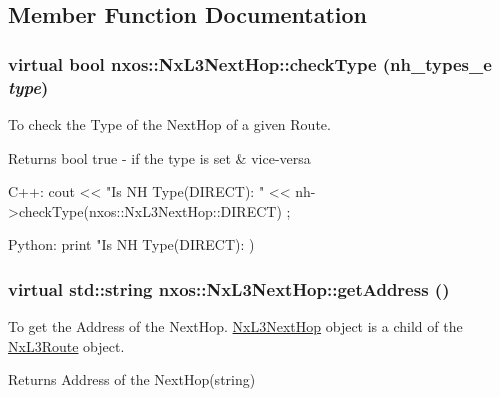 \subsection{Member Function Documentation}
\hypertarget{classnxos_1_1NxL3NextHop_a8a061c4cbcd814b197ea778514a20cb8}{
\subsubsection[{checkType}]{\setlength{\rightskip}{0pt plus 5cm}virtual bool nxos::NxL3NextHop::checkType ({\bf nh\_\-types\_\-e} {\em type})}}
\label{classnxos_1_1NxL3NextHop_a8a061c4cbcd814b197ea778514a20cb8}
To check the Type of the NextHop of a given Route.

\begin{DoxyReturn}{Returns}
bool true -\/ if the type is set \& vice-\/versa
\end{DoxyReturn}

\begin{DoxyCode}
  C++:
       cout << "Is NH Type(DIRECT): " << nh->checkType(nxos::NxL3NextHop::DIRECT)
      ;

  Python:
       print "Is NH Type(DIRECT): %
      )
\end{DoxyCode}
 \hypertarget{classnxos_1_1NxL3NextHop_a3a14a096cdf818a156c1be62623e644c}{
\subsubsection[{getAddress}]{\setlength{\rightskip}{0pt plus 5cm}virtual std::string nxos::NxL3NextHop::getAddress ()}}
\label{classnxos_1_1NxL3NextHop_a3a14a096cdf818a156c1be62623e644c}
To get the Address of the NextHop. \hyperlink{classnxos_1_1NxL3NextHop}{NxL3NextHop} object is a child of the \hyperlink{classnxos_1_1NxL3Route}{NxL3Route} object.

\begin{DoxyReturn}{Returns}
Address of the NextHop(string)
\end{DoxyReturn}

